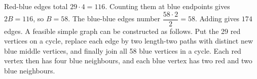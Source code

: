 Red-blue edges total $29\cdot4=116$. Counting them at blue endpoints gives $2B=116$, so $B=58$. The blue-blue edges number $\dfrac{58\cdot2}{2}=58$. Adding gives $\boxed{174}$ edges. A feasible simple graph can be constructed as follows. Put the 29 red vertices on a cycle, replace each edge by two length-two paths with distinct new blue middle vertices, and finally join all 58 blue vertices in a cycle. Each red vertex then has four blue neighbours, and each blue vertex has two red and two blue neighbours.
